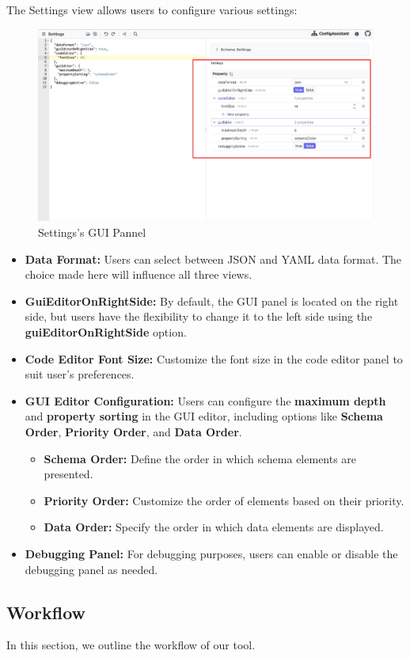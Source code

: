 The Settings view allows users to configure various settings:
\begin{figure}[h]
    \includegraphics[width=3.5 in]{figures/GUI Editor Pannel Settings}
    \caption{Settings's GUI Pannel}
\end{figure}
\begin{itemize}
    \item \textbf{Data Format:} Users can select between JSON and YAML data format.
    The choice made here will influence all three views.
    \item \textbf{GuiEditorOnRightSide:} By default, the GUI panel is located on the right side, but users have the flexibility to change it to the left side using the \textbf{guiEditorOnRightSide} option.
    \item \textbf{Code Editor Font Size:} Customize the font size in the code editor panel to suit user's preferences.
    \item \textbf{GUI Editor Configuration:} Users can configure the \textbf{maximum depth} and \textbf{property sorting} in the GUI editor, including options like \textbf{Schema Order}, \textbf{Priority Order}, and \textbf{Data Order}.
    \begin{itemize}
        \item \textbf{Schema Order:} Define the order in which schema elements are presented.
        \item \textbf{Priority Order:} Customize the order of elements based on their priority.
        \item \textbf{Data Order:} Specify the order in which data elements are displayed.
    \end{itemize}
    \item \textbf{Debugging Panel:} For debugging purposes, users can enable or disable the debugging panel as needed.
\end{itemize}

\subsection{Workflow}\label{subsec:workflow}
In this section, we outline the workflow of our tool.

